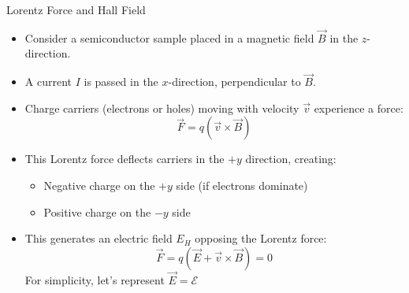 \begin{frame}{Lorentz Force and Hall Field}
    \begin{itemize}
        \item Consider a semiconductor sample placed in a magnetic field $\vec{B}$ in the $z$-direction.
        \item A current $I$ is passed in the $x$-direction, perpendicular to $\vec{B}$.
        \item Charge carriers (electrons or holes) moving with velocity $\vec{v}$ experience a force:
        \begin{equation}
        \vec{F} = q(\vec{v} \times \vec{B})
        \end{equation}
        \item This Lorentz force deflects carriers in the $+y$ direction, creating:
        \begin{itemize}
            \item Negative charge on the $+y$ side (if electrons dominate)
            \item Positive charge on the $-y$ side
        \end{itemize}
        \item This generates an electric field $E_H$ opposing the Lorentz force:
        \begin{equation} \label{eq:Lorentz_force}
        \vec{F} = q(\vec{E} + \vec{v} \times \vec{B}) = 0 
        \end{equation}
        For simplicity, let's represent $\vec{E}=\mathcal{E}$
    \end{itemize}
\end{frame}

